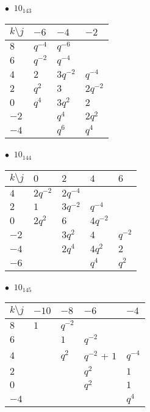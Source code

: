 %
\begin{minipage}{\linewidth}
$\bullet\ $ $10_{143}$ \vspace{0.5em} \\
\begin{tabular}{l|lll}
$k \setminus j$ & $-6$ & $-4$ & $-2$ \\
\hline
$8$ & $q^{-4}$ & $q^{-6}$ &  \\
$6$ & $q^{-2}$ & $q^{-4}$ &  \\
$4$ & $2$ & $3q^{-2}$ & $q^{-4}$ \\
$2$ & $q^{2}$ & $3$ & $2q^{-2}$ \\
$0$ & $q^{4}$ & $3q^{2}$ & $2$ \\
$-2$ &  & $q^{4}$ & $2q^{2}$ \\
$-4$ &  & $q^{6}$ & $q^{4}$ \\
\end{tabular}
\vspace{2em}
\end{minipage}
%
\begin{minipage}{\linewidth}
$\bullet\ $ $10_{144}$ \vspace{0.5em} \\
\begin{tabular}{l|llll}
$k \setminus j$ & $0$ & $2$ & $4$ & $6$ \\
\hline
$4$ & $2q^{-2}$ & $2q^{-4}$ &  &  \\
$2$ & $1$ & $3q^{-2}$ & $q^{-4}$ &  \\
$0$ & $2q^{2}$ & $6$ & $4q^{-2}$ &  \\
$-2$ &  & $3q^{2}$ & $4$ & $q^{-2}$ \\
$-4$ &  & $2q^{4}$ & $4q^{2}$ & $2$ \\
$-6$ &  &  & $q^{4}$ & $q^{2}$ \\
\end{tabular}
\vspace{2em}
\end{minipage}
%
\begin{minipage}{\linewidth}
$\bullet\ $ $10_{145}$ \vspace{0.5em} \\
\begin{tabular}{l|llll}
$k \setminus j$ & $-10$ & $-8$ & $-6$ & $-4$ \\
\hline
$8$ & $1$ & $q^{-2}$ &  &  \\
$6$ &  & $1$ & $q^{-2}$ &  \\
$4$ &  & $q^{2}$ & $q^{-2}$ + $1$ & $q^{-4}$ \\
$2$ &  &  & $q^{2}$ & $1$ \\
$0$ &  &  & $q^{2}$ & $1$ \\
$-4$ &  &  &  & $q^{4}$ \\
\end{tabular}
\vspace{2em}
\end{minipage}
